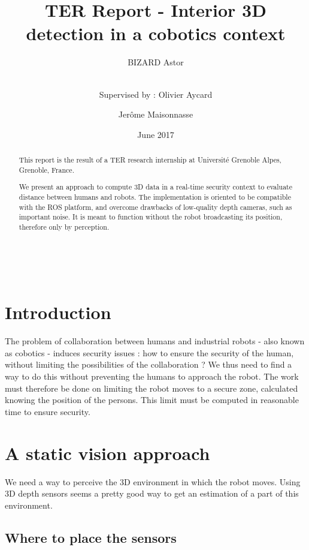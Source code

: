 \documentclass[smallextended]{svjour3}
\title{TER Report - Interior 3D detection in a cobotics context}
\author{BIZARD Astor  \\ \and \\
      Supervised by : Olivier Aycard  \and Jerôme Maisonnasse
}
\institute{
}
\date{June 2017}
\begin{document}
\maketitle


\renewcommand{\abstractname}{Acknowledgement}
\begin{abstract}
This report is the result of a TER research internship at Université Grenoble Alpes, Grenoble, France.
\end{abstract}
\\
\renewcommand{\abstractname}{Abstract}
\begin{abstract}
We present an approach to compute 3D data in a real-time security context to evaluate distance between humans and robots. The implementation is oriented to be compatible with the ROS platform, and overcome drawbacks of low-quality depth cameras, such as important noise. It is meant to function without the robot broadcasting its position, therefore only by perception.
\end{abstract}

\section{Introduction}

The problem of collaboration between humans and industrial robots - also known as cobotics - induces security issues : how to ensure the security of the human, without limiting the possibilities of the collaboration ? We thus need to find a way to do this without preventing the humans to approach the robot. The work must therefore be done on limiting the robot moves to a secure zone, calculated knowing the position of the persons. This limit must be computed in reasonable time to ensure security.

\section{A static vision approach}

We need a way to perceive the 3D environment in which the robot moves. Using 3D depth sensors seems a pretty good way to get an estimation of a part of this environment.

\subsection{Where to place the sensors}
\end{document}
